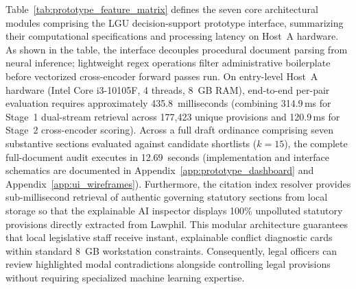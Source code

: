Table~\ref{tab:prototype_feature_matrix} defines the seven core architectural modules comprising the LGU decision-support prototype interface, summarizing their computational specifications and processing latency on Host~A hardware. As shown in the table, the interface decouples procedural document parsing from neural inference; lightweight regex operations filter administrative boilerplate before vectorized cross-encoder forward passes run. On entry-level Host~A hardware (Intel Core i3-10105F, 4 threads, 8~GB RAM), end-to-end per-pair evaluation requires approximately 435.8~milliseconds (combining 314.9\,ms for Stage~1 dual-stream retrieval across 177,423 unique provisions and 120.9\,ms for Stage~2 cross-encoder scoring). Across a full draft ordinance comprising seven substantive sections evaluated against candidate shortlists ($k=15$), the complete full-document audit executes in 12.69~seconds (implementation and interface schematics are documented in Appendix~\ref{app:prototype_dashboard} and Appendix~\ref{app:ui_wireframes}). Furthermore, the citation index resolver provides sub-millisecond retrieval of authentic governing statutory sections from local storage so that the explainable AI inspector displays 100\% unpolluted statutory provisions directly extracted from Lawphil. This modular architecture guarantees that local legislative staff receive instant, explainable conflict diagnostic cards within standard 8~GB workstation constraints. Consequently, legal officers can review highlighted modal contradictions alongside controlling legal provisions without requiring specialized machine learning expertise.

